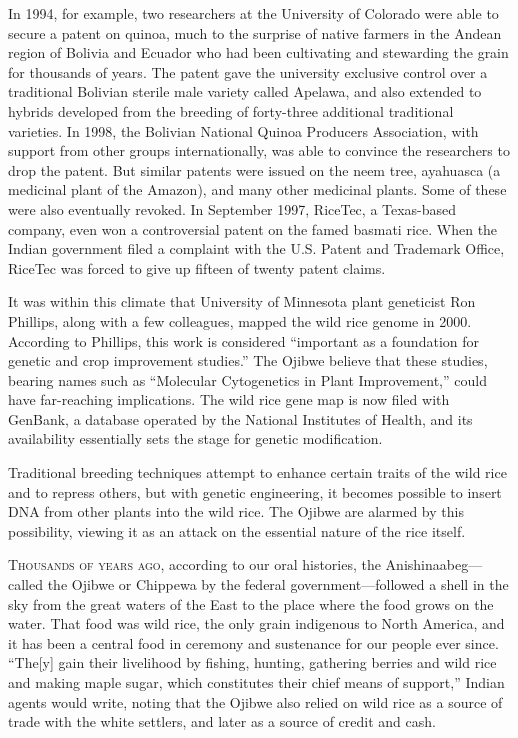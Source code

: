 In 1994, for example, two researchers at the University of Colorado were
able to secure a patent on quinoa, much to the surprise of native
farmers in the Andean region of Bolivia and
Ecuador
who had been cultivating and stewarding the grain for thousands of
years. The patent gave the university exclusive control over a
traditional Bolivian sterile male variety called Apelawa, and also
extended to hybrids developed from the breeding of forty-three
additional traditional varieties. In 1998, the Bolivian National Quinoa
Producers Association, with support from other groups internationally,
was able to convince the researchers to drop the patent. But similar
patents were issued on the neem tree, ayahuasca (a medicinal plant of
the Amazon), and many other medicinal plants. Some of these were also
eventually revoked. In September 1997, RiceTec, a Texas-based company,
even won a controversial patent on the famed basmati rice. When the
Indian government filed a complaint with the U.S. Patent and Trademark
Office, RiceTec was forced to give up fifteen of twenty patent claims.

It was within this climate that University of Minnesota plant geneticist
Ron Phillips, along with a few colleagues, mapped the wild rice genome
in 2000. According to Phillips, this work is considered ``important as a
foundation for genetic and crop improvement studies.'' The Ojibwe
believe that these studies, bearing names such as ``Molecular
Cytogenetics in Plant Improvement,'' could have far-reaching
implications. The wild rice gene map is now filed with GenBank, a
database operated by the National Institutes of Health, and its
availability essentially sets the stage for genetic modification.

Traditional breeding techniques attempt to enhance certain traits of the
wild rice and to repress others, but with genetic engineering, it
becomes possible to insert DNA from other plants into the wild rice. The
Ojibwe are alarmed by this possibility, viewing it as an attack on the
essential nature of the rice itself.

\textsc{Thousands of years ago}, according to our oral histories, the
Anishinaabeg---called the Ojibwe or Chippewa by the federal
government---followed a shell in the sky from the great waters of the East to
the
place where the food grows on the water. That food was wild rice, the
only grain indigenous to North America, and it has been a central food
in ceremony and sustenance for our people ever since. ``The[y] gain
their livelihood by fishing, hunting, gathering berries and wild rice
and making maple sugar, which constitutes their chief means of
support,'' Indian agents would write, noting that the Ojibwe also relied
on wild rice as a source of trade with the white settlers, and later as
a source of credit and cash.

